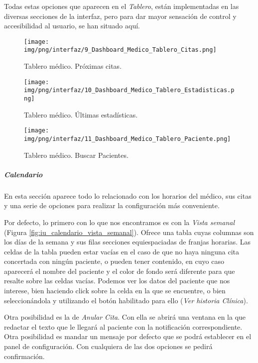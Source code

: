 \documentclass[a4paper,oneside,11pt]{book}
\begin{document}
			Todas estas opciones que aparecen en el \textit{Tablero}, están implementadas en las diversas secciones de la interfaz, pero para dar mayor sensación de control y accesibilidad al usuario, se han situado aquí.
			
			
			\begin{figure}[H]
			  \centering
			    \texttt{[image: img/png/interfaz/9\_Dashboard\_Medico\_Tablero\_Citas.png]}
			  \caption{Tablero médico. Próximas citas.}
			  \label{fig:iu_tablero_medico_citas}
			\end{figure}
			
			\begin{figure}[H]
			  \centering
			    \texttt{[image: img/png/interfaz/10\_Dashboard\_Medico\_Tablero\_Estadisticas.png]}
			  \caption{Tablero médico. Últimas estadísticas.}
			  \label{fig:iu_tablero_medico_estadisticas}
			\end{figure}
			
			\begin{figure}[H]
			  \centering
			    \texttt{[image: img/png/interfaz/11\_Dashboard\_Medico\_Tablero\_Paciente.png]}
			  \caption{Tablero médico. Buscar Pacientes.}
			  \label{fig:iu_tablero_medico_pacientes}
			\end{figure}
		
		
		
		\subparagraph{Calendario} %
		\label{par:medico_calendario}
		
			En esta sección aparece todo lo relacionado con los horarios del médico, sus citas y una serie de opciones para realizar la configuración  más conveniente.
			
			Por defecto, lo primero con lo que nos encontramos es con la \textit{Vista semanal} (Figura \ref{fig:iu_calendario_vista_semanal}). Ofrece una tabla cuyas columnas son los días de la semana y sus filas secciones equiespaciadas de franjas horarias. Las celdas de la tabla pueden estar vacías en el caso de que no haya ninguna cita concertada con ningún paciente, o pueden tener contenido, en cuyo caso aparecerá el nombre del paciente y el color de fondo será diferente para que resalte sobre las celdas vacías. Podemos ver los datos del paciente que nos interese, bien haciendo click sobre la celda en la que se encuentre, o bien seleccionándola y utilizando el botón habilitado para ello (\textit{Ver historia Clínica}). 
			
			Otra posibilidad es la de \textit{Anular Cita}. Con ella se abrirá una ventana en la que redactar el texto que le llegará al paciente con la notificación correspondiente. Otra posibilidad es mandar un mensaje por defecto que se podrá establecer en el panel de configuración. Con cualquiera de las dos opciones se pedirá confirmación.			
			
\end{document}
